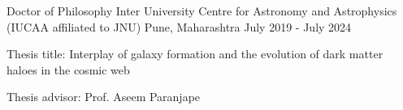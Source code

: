 


\begin{cventries}
{
\cventry
{Doctor of Philosophy}
{Inter University Centre for Astronomy and Astrophysics (IUCAA affiliated to JNU)}
{Pune, Maharashtra}
{July 2019 - July 2024 }
{
\begin{cvitems}
\item Thesis title: Interplay of galaxy formation and the evolution of dark matter haloes in the cosmic web
\item Thesis advisor: Prof. Aseem Paranjape
\end{cvitems}
}
}


\end{cventries}

